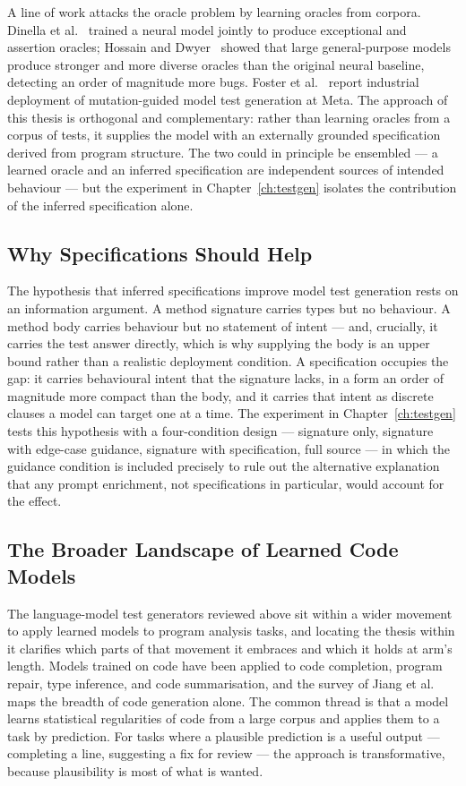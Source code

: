 A line of work attacks the oracle problem by learning oracles from corpora.
Dinella et al.~\cite{dinella2022toga} trained a neural model jointly to
produce exceptional and assertion oracles; Hossain and
Dwyer~\cite{hossain2024togll} showed that large general-purpose models produce
stronger and more diverse oracles than the original neural baseline, detecting
an order of magnitude more bugs. Foster et al.~\cite{foster2025meta} report
industrial deployment of mutation-guided model test generation at Meta. The
approach of this thesis is orthogonal and complementary: rather than learning
oracles from a corpus of tests, it supplies the model with an externally
grounded specification derived from program structure. The two could in
principle be ensembled --- a learned oracle and an inferred specification are
independent sources of intended behaviour --- but the experiment in
Chapter~\ref{ch:testgen} isolates the contribution of the inferred
specification alone.

\subsection{Why Specifications Should Help}

The hypothesis that inferred specifications improve model test generation
rests on an information argument. A method signature carries types but no
behaviour. A method body carries behaviour but no statement of intent --- and,
crucially, it carries the test answer directly, which is why supplying the
body is an upper bound rather than a realistic deployment condition. A
specification occupies the gap: it carries behavioural intent that the
signature lacks, in a form an order of magnitude more compact than the body,
and it carries that intent as discrete clauses a model can target one at a
time. The experiment in Chapter~\ref{ch:testgen} tests this hypothesis with a
four-condition design --- signature only, signature with edge-case guidance,
signature with specification, full source --- in which the guidance condition
is included precisely to rule out the alternative explanation that any prompt
enrichment, not specifications in particular, would account for the effect.

\subsection{The Broader Landscape of Learned Code Models}

The language-model test generators reviewed above sit within a wider movement to
apply learned models to program analysis tasks, and locating the thesis within it
clarifies which parts of that movement it embraces and which it holds at arm's
length. Models trained on code have been applied to code completion, program
repair, type inference, and code summarisation, and the survey of Jiang et
al.~\cite{jiang2024survey} maps the breadth of code generation alone. The common
thread is that a model learns statistical regularities of code from a large corpus
and applies them to a task by prediction. For tasks where a plausible prediction
is a useful output --- completing a line, suggesting a fix for review --- the
approach is transformative, because plausibility is most of what is wanted.

